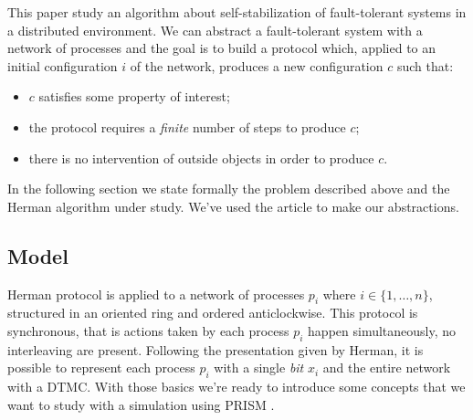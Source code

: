 This paper study an algorithm about self-stabilization of
fault-tolerant systems in a distributed environment. We can abstract a
fault-tolerant system with a network of processes and the goal is to
build a protocol which, applied to an initial configuration $i$ of the
network, produces a new configuration $c$ such that:
\begin{itemize}
\item $c$ satisfies some property of interest;
\item the protocol requires a \emph{finite} number of steps to produce
  $c$;
\item there is no intervention of outside objects in order to produce
  $c$.
\end{itemize}
In the following section we state formally the problem described above
and the Herman algorithm under study. We've used the article \cite{
  KNP12a} to make our abstractions.

\subsection{Model}

Herman protocol \cite{Her90} is applied to a network of processes
$p_i$ where $i \in \{1,\ldots, n\}$, structured in an oriented ring
and ordered anticlockwise. This protocol is synchronous, that is
actions taken by each process $p_i$ happen simultaneously, no
interleaving are present. Following the presentation given by Herman,
it is possible to represent each process $p_i$ with a single
\emph{bit} $x_i$ and the entire network with a DTMC. With those basics
we're ready to introduce some concepts that we want to study with a
simulation using PRISM \cite{KNP11}.

